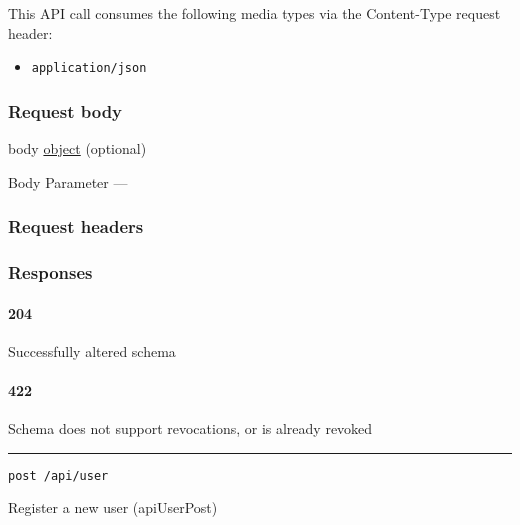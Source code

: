 This API call consumes the following media types via the {Content-Type}
request header:

\begin{itemize}
\tightlist
\item
  \texttt{application/json}
\end{itemize}

\hypertarget{request-body-26}{%
\subsubsection{Request body}\label{request-body-26}}

body \protect\hyperlink{object}{object} (optional)

{Body Parameter} ---

\hypertarget{request-headers-46}{%
\subsubsection{Request headers}\label{request-headers-46}}

\hypertarget{responses-79}{%
\subsubsection{Responses}\label{responses-79}}

\hypertarget{section-258}{%
\paragraph{204}\label{section-258}}

Successfully altered schema \protect\hyperlink{}{}

\hypertarget{section-259}{%
\paragraph{422}\label{section-259}}

Schema does not support revocations, or is already revoked
\protect\hyperlink{}{}

\begin{center}\rule{0.5\linewidth}{\linethickness}\end{center}

\protect\hypertarget{apiUserPost}{}{}

\begin{verbatim}
post /api/user
\end{verbatim}

Register a new user ({apiUserPost})

